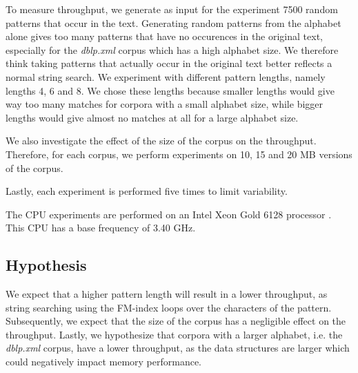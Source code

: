 To measure throughput, we generate as input for the experiment 7500 random patterns that occur in the text.
Generating random patterns from the alphabet alone gives too many patterns that have no occurences in the original text, especially for the \textit{dblp.xml} corpus which has a high alphabet size.
We therefore think taking patterns that actually occur in the original text better reflects a normal string search.
We experiment with different pattern lengths, namely lengths 4, 6 and 8.
We chose these lengths because smaller lengths would give way too many matches for corpora with a small alphabet size, while bigger lengths would give almost no matches at all for a large alphabet size.

We also investigate the effect of the size of the corpus on the throughput.
Therefore, for each corpus, we perform experiments on 10, 15 and 20 MB versions of the corpus.

Lastly, each experiment is performed five times to limit variability.

The CPU experiments are performed on an Intel Xeon Gold 6128 processor \cite{noauthor_intel_nodate}.
This CPU has a base frequency of 3.40 GHz.

\subsection{Hypothesis} \label{section:cpu_hypothesis}

We expect that a higher pattern length will result in a lower throughput, as string searching using the FM-index loops over the characters of the pattern.
Subsequently, we expect that the size of the corpus has a negligible effect on the throughput.
Lastly, we hypothesize that corpora with a larger alphabet, i.e. the \textit{dblp.xml} corpus, have a lower throughput, as the data structures are larger which could negatively impact memory performance.
